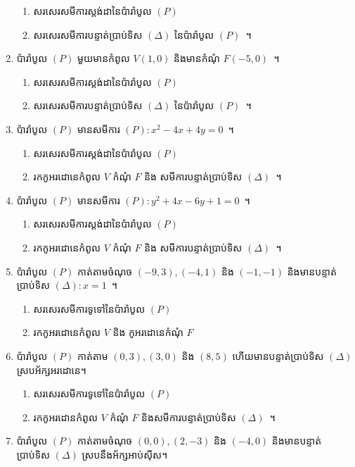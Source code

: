 \begin{enumerate}
\begin{enumerate}
		\item សរសេរសមីការស្តង់ដានៃប៉ារ៉ាបូល $ (P) $
		\item សរសេរសមីការបន្ទាត់ប្រាប់ទិស $ (\Delta) $ នៃប៉ារ៉ាបូល $ (P) $~។
	\end{enumerate}
	\item ប៉ារ៉ាបូល $ (P) $ មួយមានកំពូល $ V(1,0) $ និងមានកំណុំ $ F(-5,0) $~។
	\begin{enumerate}
		\item សរសេរសមីការស្តង់ដានៃប៉ារ៉ាបូល $ (P) $
		\item សរសេរសមីការបន្ទាត់ប្រាប់ទិស $ (\Delta) $ នៃប៉ារ៉ាបូល $ (P) $~។
	\end{enumerate}
	\item ប៉ារ៉ាបូល $ (P) $ មានសមីការ $ (P): x^2-4x+4y=0 $~។
	\begin{enumerate}
		\item សរសេរសមីការស្តង់ដានៃប៉ារ៉ាបូល $ (P) $
		\item រកកូអរដោនេកំពូល $ V $ កំណុំ $ F $ និង សមីការបន្ទាត់ប្រាប់ទិស $ (\Delta) $~។
	\end{enumerate}
	\item ប៉ារ៉ាបូល $ (P) $ មានសមីការ $ (P): y^2+4x-6y+1=0 $~។
	\begin{enumerate}
		\item សរសេរសមីការស្តង់ដានៃប៉ារ៉ាបូល $ (P) $
		\item រកកូអរដោនេកំពូល $ V $ កំណុំ $ F $ និង សមីការបន្ទាត់ប្រាប់ទិស $ (\Delta) $~។
	\end{enumerate}
	\item ប៉ារ៉ាបូល $ (P) $ កាត់តាមចំណុច $ (-9,3),(-4,1) $ និង $ (-1,-1) $ និងមានបន្ទាត់ប្រាប់ទិស $ (\Delta): x=1 $~។
	\begin{enumerate}
		\item សរសេរសមីការទូទៅនៃប៉ារ៉ាបូល $ (P) $
		\item រកកូអរដោនេកំពូល $ V $ និង កូអរដោនេកំណុំ $ F $
	\end{enumerate}
	\item ប៉ារ៉ាបូល $ (P) $ កាត់តាម $ (0,3),(3,0) $ និង $ (8,5) $ ហើយមានបន្ទាត់ប្រាប់ទិស $ (\Delta) $ ស្របអ័ក្សអរដោនេ។
	\begin{enumerate}
		\item សរសេរសមីការទូទៅនៃប៉ារ៉ាបូល $ (P) $
		\item រកកូអរដោនកំពូល $ V $ កំណុំ $ F $ និងសមីការបន្ទាត់ប្រាប់ទិស $ (\Delta) $~។
	\end{enumerate}
	\item ប៉ារ៉ាបូល $ (P) $ កាត់តាមចំណុច $ (0,0),(2,-3) $ និង $ (-4,0) $ និងមានបន្ទាត់ប្រាប់ទិស $ (\Delta) $ ស្របនឹងអ័ក្សអាប់ស៊ីស។

\end{enumerate}
